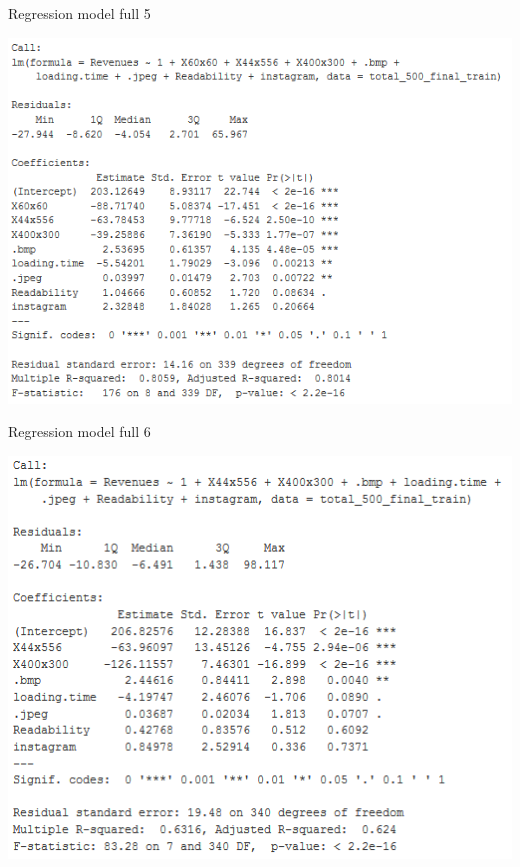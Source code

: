 \documentclass{book}
\begin{document}
\begin{table}[H]
\centering
\caption{Regression model full 5}\label{d :r :5}
\begin{center}
\includegraphics[scale=0.6]{../R/photos/87_full5.PNG}  \\
\end{center}
\end{table}


\begin{table}[H]
\centering
\caption{Regression model full 6}\label{d :r :6}
\begin{center}
\includegraphics[scale=0.6]{../R/photos/99_model6.PNG}  \\
\end{center}
\end{table}
\end{document}
